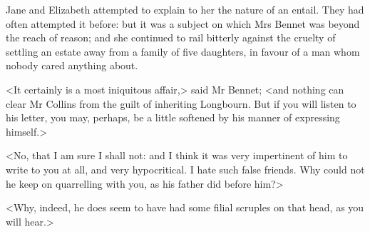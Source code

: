 Jane and Elizabeth attempted to explain to her the nature of an entail. They had often attempted it before: but it was a subject on which Mrs Bennet was beyond the reach of reason; and she continued to rail bitterly against the cruelty of settling an estate away from a family of five daughters, in favour of a man whom nobody cared anything about.

<It certainly is a most iniquitous affair,> said Mr Bennet; <and nothing can clear Mr Collins from the guilt of inheriting Longbourn. But if you will listen to his letter, you may, perhaps, be a little softened by his manner of expressing himself.>

<No, that I am sure I shall not: and I think it was very impertinent of him to write to you at all, and very hypocritical. I hate such false friends. Why could not he keep on quarrelling with you, as his father did before him?>

<Why, indeed, he does seem to have had some filial scruples on that head, as you will hear.>

